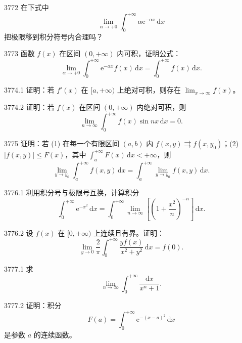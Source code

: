 \begin{prob}[M]{3772}
在下式中
\[
\lim_{\alpha \to +0} \int_{0}^{+\infty} \alpha \mathrm{e}^{-\alpha x}\,\mathrm{d}x
\]
把极限移到积分符号内合理吗？
\end{prob}

\begin{prob}[M]{3773}
函数 $f(x)$ 在区间 $(0, +\infty)$ 内可积，证明公式：
\[
\lim_{\alpha \to +0} \int_{0}^{+\infty} \mathrm{e}^{-\alpha x} f(x)\,\mathrm{d}x = \int_{0}^{+\infty} f(x)\,\mathrm{d}x.
\]
\end{prob}

\begin{prob}[M]{3774.1}
证明：若 $f'(x)$ 在 $[a, +\infty)$ 上绝对可积，则存在 $\lim_{x \to \infty} f(x)$。
\end{prob}

\begin{prob}[M]{3774.2}
证明：若 $f(x)$ 在区间 $(0, +\infty)$ 内绝对可积，则
\[
\lim_{n \to \infty} \int_{0}^{+\infty} f(x) \sin nx\,\mathrm{d}x = 0.
\]
\end{prob}

\begin{prob}[M]{3775}
证明：若 (1) 在每一个有限区间 $(a, b)$ 内 $f(x, y) \rightrightarrows f(x, y_0)$；(2) $|f(x, y)| \leqslant F(x)$，其中 $\int_{a}^{+\infty} F(x)\,\mathrm{d}x < +\infty$，则
\[
\lim_{y \to y_0} \int_{a}^{+\infty} f(x, y)\,\mathrm{d}x = \int_{a}^{+\infty} \lim_{y \to y_0} f(x, y)\,\mathrm{d}x.
\]
\end{prob}

\begin{prob}[M]{3776.1}
利用积分号与极限号互换，计算积分
\[
\int_{0}^{+\infty} \mathrm{e}^{-x^2}\,\mathrm{d}x = \int_{0}^{+\infty} \lim_{n \to \infty} \left[\left(1 + \frac{x^2}{n}\right)^{-n}\right]\,\mathrm{d}x.
\]
\end{prob}

\begin{prob}[M]{3776.2}
设 $f(x)$ 在 $[0, +\infty)$ 上连续且有界。证明：
\[
\lim_{y \to 0} \frac{2}{\pi} \int_{0}^{+\infty} \frac{y f(x)}{x^2 + y^2}\,\mathrm{d}x = f(0).
\]
\end{prob}

\begin{prob}[M]{3777.1}
求
\[
\lim_{n \to \infty} \int_{0}^{+\infty} \frac{\mathrm{d}x}{x^n + 1}.
\]
\end{prob}

\begin{prob}[M]{3777.2}
证明：积分
\[
F(a) = \int_{0}^{+\infty} \mathrm{e}^{-(x-a)^2}\,\mathrm{d}x
\]
是参数 $a$ 的连续函数。
\end{prob}

